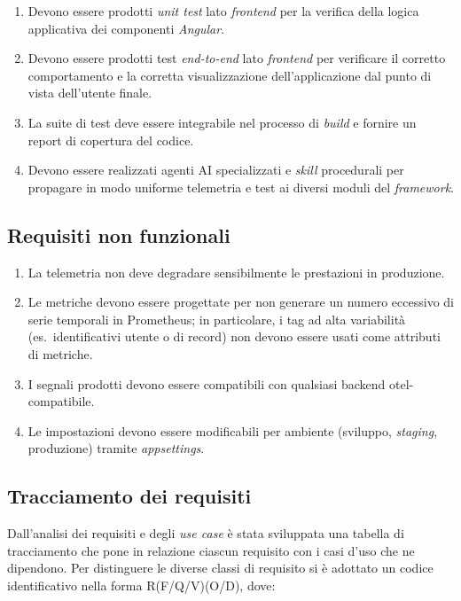 \begin{enumerate}[label=RF\arabic*.]
  \item Devono essere prodotti \emph{unit test} lato \emph{frontend} per la verifica
        della logica applicativa dei componenti \emph{Angular}.
  \item Devono essere prodotti test \emph{end-to-end} lato \emph{frontend} per
        verificare il corretto comportamento e la corretta visualizzazione
        dell'applicazione dal punto di vista dell'utente finale.
  \item La suite di test deve essere integrabile nel processo di \emph{build} e
        fornire un report di copertura del codice.
  \item Devono essere realizzati agenti AI specializzati e \emph{skill} procedurali
        per propagare in modo uniforme telemetria e test ai diversi moduli del
        \emph{framework}.
\end{enumerate}

\subsection{Requisiti non funzionali}

\begin{enumerate}[label=RNF\arabic*.]
  \item La telemetria non deve degradare sensibilmente le prestazioni in produzione.
  \item Le metriche devono essere progettate per non generare un numero eccessivo di serie temporali in Prometheus; in particolare, i tag ad alta variabilità (es.\ identificativi utente o di record) non devono essere usati come attributi di metriche.
  \item I segnali prodotti devono essere compatibili con qualsiasi backend \gls{otel}-compatibile.
  \item Le impostazioni devono essere modificabili per ambiente (sviluppo, \emph{staging}, produzione) tramite \emph{appsettings}.
\end{enumerate}

\subsection{Tracciamento dei requisiti}

Dall'analisi dei requisiti e degli \emph{use case} è stata sviluppata una
tabella di tracciamento che pone in relazione ciascun requisito con i casi
d'uso che ne dipendono. Per distinguere le diverse classi di requisito si è
adottato un codice identificativo nella forma R(F/Q/V)(O/D), dove:

